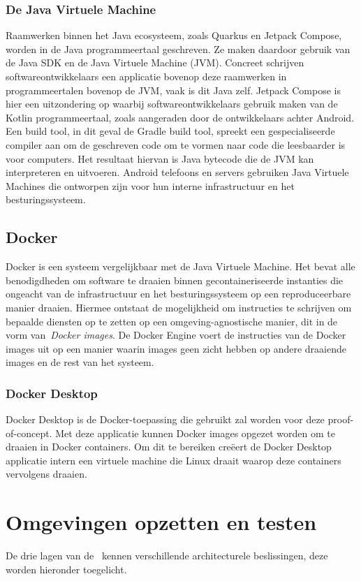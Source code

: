 \subsubsection{De Java Virtuele Machine}
Raamwerken binnen het Java ecosysteem, zoals Quarkus en Jetpack Compose, worden in de Java programmeertaal geschreven.
Ze maken daardoor gebruik van de Java SDK en de Java Virtuele Machine (JVM).
Concreet schrijven softwareontwikkelaars een applicatie bovenop deze raamwerken in programmeertalen bovenop de JVM\@, vaak is dit Java zelf.
Jetpack Compose is hier een uitzondering op waarbij softwareontwikkelaars gebruik maken van de Kotlin programmeertaal, zoals aangeraden door de ontwikkelaars achter Android.
Een build tool, in dit geval de Gradle build tool, spreekt een gespecialiseerde compiler aan om de geschreven code om te vormen naar code die leesbaarder is voor computers.
Het resultaat hiervan is Java bytecode die de JVM kan interpreteren en uitvoeren.
Android telefoons en servers gebruiken Java Virtuele Machines die ontworpen zijn voor hun interne infrastructuur en het besturingssysteem.

\subsection{Docker}
\label{subsec:docker}
Docker is een systeem vergelijkbaar met de Java Virtuele Machine.
Het bevat alle benodigdheden om software te draaien binnen gecontaineriseerde instanties die ongeacht van de infrastructuur en het besturingssysteem op een reproduceerbare manier draaien.
Hiermee ontstaat de mogelijkheid om instructies te schrijven om bepaalde diensten op te zetten op een omgeving-agnostische manier, dit in de vorm van~\textit{Docker images}.
De Docker Engine voert de instructies van de Docker images uit op een manier waarin images geen zicht hebben op andere draaiende images en de rest van het systeem.

\subsubsection{Docker Desktop}
Docker Desktop is de Docker-toepassing die gebruikt zal worden voor deze proof-of-concept.
Met deze applicatie kunnen Docker images opgezet worden om te draaien in Docker containers.
Om dit te bereiken creëert de Docker Desktop applicatie intern een virtuele machine die Linux draait waarop deze containers vervolgens draaien.

\section{Omgevingen opzetten en testen}
\label{sec:omgevingen-opzetten}
De drie lagen van de~ kennen verschillende architecturele beslissingen, deze worden hieronder toegelicht.

